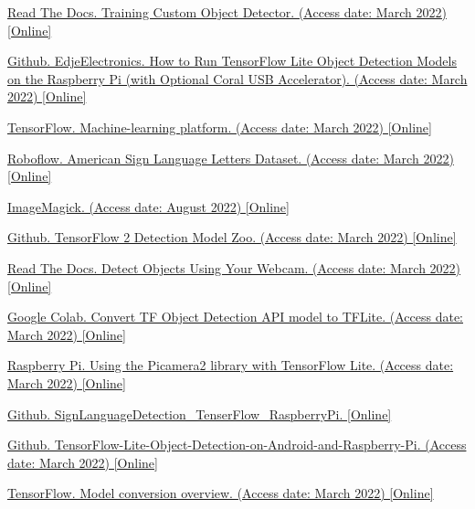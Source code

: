 \documentclass[10pt]{article}
\begin{document}
\begin{thebibliography}{1}
	\href{https://tensorflow-object-detection-api-tutorial.readthedocs.io/en/latest/training.html}{Read The Docs. Training Custom Object Detector. (Access date: March 2022) [Online]}
	
	\href{https://github.com/EdjeElectronics/TensorFlow-Lite-Object-Detection-on-Android-and-Raspberry-Pi/blob/master/Raspberry_Pi_Guide.md#step-1b-download-this-repository-and-create-virtual-environment}{Github. EdjeElectronics. How to Run TensorFlow Lite Object Detection Models on the Raspberry Pi (with Optional Coral USB Accelerator). (Access date: March 2022) [Online]}

	\href{https://www.tensorflow.org}{TensorFlow. Machine-learning platform. (Access date: March 2022) [Online]}

	\href{https://public.roboflow.com/object-detection/american-sign-language-letters/1}{Roboflow. American Sign Language Letters Dataset. (Access date: March 2022) [Online]}

	\href{https://imagemagick.org/index.php}{ImageMagick. (Access date: August 2022) [Online]}

	\href{https://github.com/tensorflow/models/blob/master/research/object_detection/g3doc/tf2_detection_zoo.md}{Github. TensorFlow 2 Detection Model Zoo. (Access date: March 2022) [Online]}

	\href{https://tensorflow-object-detection-api-tutorial.readthedocs.io/en/latest/auto_examples/object_detection_camera.html#detect-objects-using-your-webcam}{Read The Docs. Detect Objects Using Your Webcam. (Access date: March 2022) [Online]}

	\href{https://colab.research.google.com/github/tensorflow/models/blob/master/research/object_detection/colab_tutorials/convert_odt_model_to_TFLite.ipynb#scrollTo=-ecGLG_Ovjcr}{Google Colab. Convert TF Object Detection API model to TFLite. (Access date: March 2022) [Online]}

	\href{https://www.raspberrypi.com/news/using-the-picamera2-library-with-tensorflow-lite/}{Raspberry Pi. Using the Picamera2 library with TensorFlow Lite. (Access date: March 2022) [Online]}

	\href{https://github.com/Yeshey/SignLanguageDetection_TenserFlow_RaspberryPi}{Github. SignLanguageDetection\_TenserFlow\_RaspberryPi. [Online]}

	\href{https://github.com/EdjeElectronics/TensorFlow-Lite-Object-Detection-on-Android-and-Raspberry-Pi}{Github. TensorFlow-Lite-Object-Detection-on-Android-and-Raspberry-Pi. (Access date: March 2022) [Online]}

	\href{https://www.tensorflow.org/lite/models/convert}{TensorFlow. Model conversion overview. (Access date: March 2022) [Online]}

\end{thebibliography}
\end{document}
